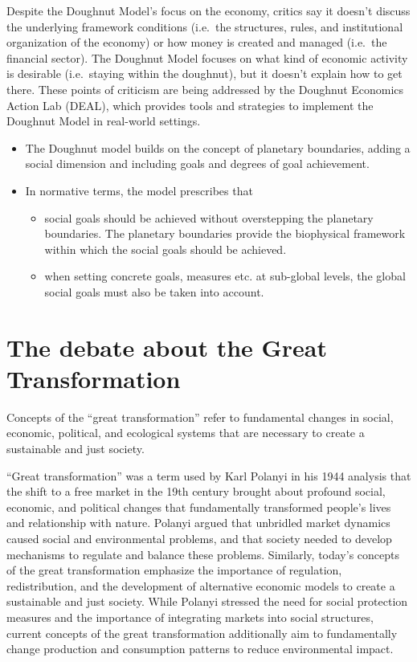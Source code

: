 \documentclass[
  a4paper,
  openany]{book}
\begin{document}
Despite the Doughnut Model's focus on the economy, critics say it
doesn't discuss the underlying framework conditions (i.e.~the
structures, rules, and institutional organization of the economy) or how
money is created and managed (i.e.~the financial sector). The Doughnut
Model focuses on what kind of economic activity is desirable
(i.e.~staying within the doughnut), but it doesn't explain how to get
there. These points of criticism are being addressed by the Doughnut
Economics Action Lab (DEAL), which provides tools and strategies to
implement the Doughnut Model in real-world settings.

\begin{itemize}
\item
  The Doughnut model builds on the concept of planetary boundaries,
  adding a social dimension and including goals and degrees of goal
  achievement.
\item
  In normative terms, the model prescribes that

  \begin{itemize}
  \item
    social goals should be achieved without overstepping the planetary
    boundaries. The planetary boundaries provide the biophysical
    framework within which the social goals should be achieved.
  \item
    when setting concrete goals, measures etc. at sub-global levels, the
    global social goals must also be taken into account.
  \end{itemize}
\end{itemize}

\section{The debate about the Great
Transformation}\label{the-debate-about-the-great-transformation}

Concepts of the ``great transformation'' refer to fundamental changes in
social, economic, political, and ecological systems that are necessary
to create a sustainable and just society.

``Great transformation'' was a term used by Karl Polanyi in his 1944
analysis that the shift to a free market in the 19th century brought
about profound social, economic, and political changes that
fundamentally transformed people's lives and relationship with nature.
Polanyi argued that unbridled market dynamics caused social and
environmental problems, and that society needed to develop mechanisms to
regulate and balance these problems. Similarly, today's concepts of the
great transformation emphasize the importance of regulation,
redistribution, and the development of alternative economic models to
create a sustainable and just society. While Polanyi stressed the need
for social protection measures and the importance of integrating markets
into social structures, current concepts of the great transformation
additionally aim to fundamentally change production and consumption
patterns to reduce environmental impact.
\end{document}
